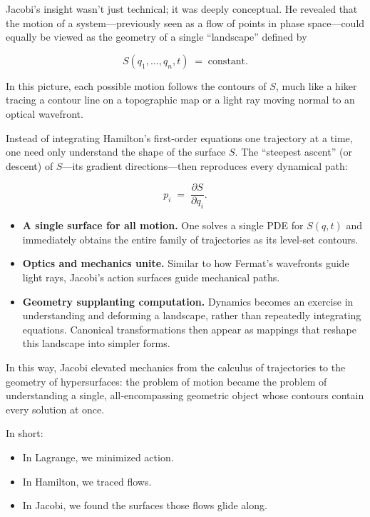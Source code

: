 Jacobi’s insight wasn’t just technical; it was deeply conceptual.  He revealed that the motion of a system—previously seen as a flow of points in phase space—could equally be viewed as the geometry of a single “landscape” defined by

\[
S(q_1,\dots,q_n,t) \;=\;\text{constant}.
\]

In this picture, each possible motion follows the contours of \(S\), much like a hiker tracing a contour line on a topographic map or a light ray moving normal to an optical wavefront.

Instead of integrating Hamilton’s first‐order equations one trajectory at a time, one need only understand the shape of the surface \(S\).  The “steepest ascent” (or descent) of \(S\)—its gradient directions—then reproduces every dynamical path:

\[
p_i \;=\;\frac{\partial S}{\partial q_i}.
\]

\begin{itemize}
  \item \textbf{A single surface for all motion.}  One solves a single PDE for \(S(q,t)\) and immediately obtains the entire family of trajectories as its level‐set contours.
  \item \textbf{Optics and mechanics unite.}  Similar to how Fermat’s wavefronts guide light rays, Jacobi’s action surfaces guide mechanical paths.
  \item \textbf{Geometry supplanting computation.}  Dynamics becomes an exercise in understanding and deforming a landscape, rather than repeatedly integrating equations.  Canonical transformations then appear as mappings that reshape this landscape into simpler forms.
\end{itemize}

In this way, Jacobi elevated mechanics from the calculus of trajectories to the geometry of hypersurfaces:  
the problem of motion became the problem of understanding a single, all‐encompassing geometric object whose contours contain every solution at once.  

In short: 

\begin{itemize}
  \item In Lagrange, we minimized action.  
  \item In Hamilton, we traced flows.  
  \item In Jacobi, we found the surfaces those flows glide along.
\end{itemize}


